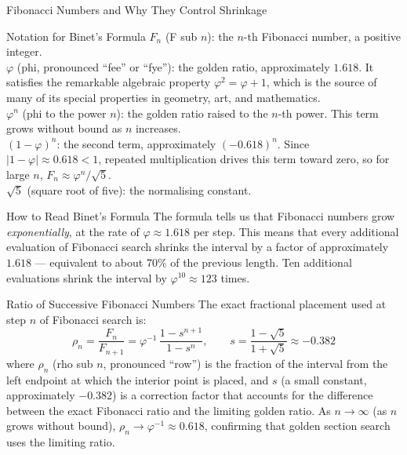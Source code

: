 \documentclass[aspectratio=169,10pt]{beamer}
\begin{document}
\begin{frame}[allowframebreaks]{Fibonacci Numbers and Why They Control Shrinkage}
  \begin{block}{Notation for Binet's Formula}
    $F_n$ (F sub $n$): the $n$-th Fibonacci number, a positive integer.\\
    $\varphi$ (phi, pronounced ``fee'' or ``fye''): the golden ratio,
    approximately $1.618$.  It satisfies the remarkable algebraic property
    $\varphi^2 = \varphi + 1$, which is the source of many of its special
    properties in geometry, art, and mathematics.\\
    $\varphi^n$ (phi to the power $n$): the golden ratio raised to the
    $n$-th power.  This term grows without bound as $n$ increases.\\
    $(1 - \varphi)^n$: the second term, approximately $(-0.618)^n$.
    Since $|1 - \varphi| \approx 0.618 < 1$, repeated multiplication drives
    this term toward zero, so for large $n$, $F_n \approx \varphi^n / \sqrt{5}$.\\
    $\sqrt{5}$ (square root of five): the normalising constant.
  \end{block}

  \begin{alertblock}{How to Read Binet's Formula}
    The formula tells us that Fibonacci numbers grow \emph{exponentially},
    at the rate of $\varphi \approx 1.618$ per step.  This means that every
    additional evaluation of Fibonacci search shrinks the interval by a factor
    of approximately $1.618$ --- equivalent to about 70\% of the previous
    length.  Ten additional evaluations shrink the interval by $\varphi^{10}
    \approx 123$ times.
  \end{alertblock}

  \begin{block}{Ratio of Successive Fibonacci Numbers}
    The exact fractional placement used at step $n$ of Fibonacci search is:
    \[
      \rho_n = \frac{F_n}{F_{n+1}} = \varphi^{-1}\,
               \frac{1 - s^{n+1}}{1 - s^{n}},
      \qquad s = \frac{1 - \sqrt{5}}{1 + \sqrt{5}} \approx -0.382
    \]
    where $\rho_n$ (rho sub $n$, pronounced ``row'') is the fraction of the
    interval from the left endpoint at which the interior point is placed, and
    $s$ (a small constant, approximately $-0.382$) is a correction factor that
    accounts for the difference between the exact Fibonacci ratio and the
    limiting golden ratio.  As $n \to \infty$ (as $n$ grows without bound),
    $\rho_n \to \varphi^{-1} \approx 0.618$, confirming that golden section
    search uses the limiting ratio.
  \end{block}

\end{frame}
\end{document}
